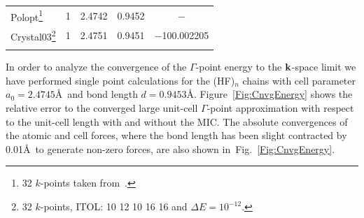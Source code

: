\documentclass[prl,twocolumn,showpacs,twocolumngrid,superbib]{revtex4}
\begin{document}
\begin{table}[t]
\begin{tabular}{lrllc}
%
    \hline
    {\sc Polopt}\footnote[2]{32 $k$-points taken from~\cite{DJacquemin99B}.} 
    & 1 & 2.4742 & 0.9452  & $-$\\
    {\sc Crystal03}\footnote[3]{32 $k$-points, ITOL: 10 12 10 16 16 and $\Delta E=10^{-12}$.}
    & 1 & 2.4751 & 0.9451 & $-$100.002205\\
    \botrule
  \end{tabular}
\end{table}

In order to analyze the convergence of the $\Gamma$-point energy to the ${\bf k}$-space limit
we have performed single point calculations for the 
(HF)$_n$ chains with cell parameter $a_0=2.4745$\AA~and bond length $d=0.9453$\AA.
Figure~\ref{Fig:CnvgEnergy} shows the relative error to the 
converged large unit-cell $\Gamma$-point approximation
with respect to the unit-cell length with and without the MIC.
The absolute convergences of the atomic and cell forces, where
the bond length has been slight contracted by 0.01\AA~to generate 
non-zero forces, are also shown in~Fig.~\ref{Fig:CnvgEnergy}.
\end{document}
